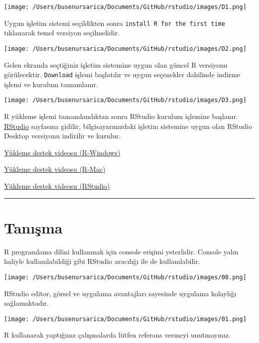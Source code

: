 \documentclass[
]{book}
\begin{document}
\texttt{[image: /Users/busenursarica/Documents/GitHub/rstudio/images/D1.png]}

Uygun işletim sistemi seçildikten sonra \texttt{install\ R\ for\ the\ first\ time} tıklanarak temel versiyon seçilmelidir.

\texttt{[image: /Users/busenursarica/Documents/GitHub/rstudio/images/D2.png]}

Gelen ekranda seçtiğiniz işletim sistemine uygun olan güncel R versiyonu görülecektir. \texttt{Download} işlemi başlatılır ve uygun seçenekler dahilinde indirme işlemi ve kurulum tamamlanır.

\texttt{[image: /Users/busenursarica/Documents/GitHub/rstudio/images/D3.png]}

R yükleme işlemi tamamlandıktan sonra RStudio kurulum işlemine başlanır. \href{https://rstudio.com/products/rstudio/download/}{RStudio} sayfasına gidilir, bilgisayarınızdaki işletim sistemine uygun olan RStudio Desktop versiyonu indirilir ve kurulur.

\href{https://www.youtube.com/watch?v=Ohnk9hcxf9M\&feature=youtu.be}{Yükleme destek videosu (R-Windows)}

\href{https://www.youtube.com/watch?v=uxuuWXU-7UQ\&feature=youtu.be}{Yükleme destek videosu (R-Mac)}

\href{https://www.youtube.com/watch?v=bM7Sfz-LADM\&feature=youtu.be}{Yükleme destek videosu (RStudio)}

\begin{center}\rule{0.5\linewidth}{0.5pt}\end{center}

\hypertarget{tanux131ux15fma}{%
\section{Tanışma}\label{tanux131ux15fma}}

R programlama dilini kullanmak için console erişimi yeterlidir. Console yalın haliyle kullanılabildiği gibi RStudio aracılığı ile de kullanılabilir.

\texttt{[image: /Users/busenursarica/Documents/GitHub/rstudio/images/00.png]}

RStudio editor, görsel ve uygulama avantajları sayesinde uygulama kolaylığı sağlamaktadır.

\texttt{[image: /Users/busenursarica/Documents/GitHub/rstudio/images/01.png]}

R kullanarak yaptığınız çalışmalarda lütfen referans vermeyi unutmayınız.
\end{document}

